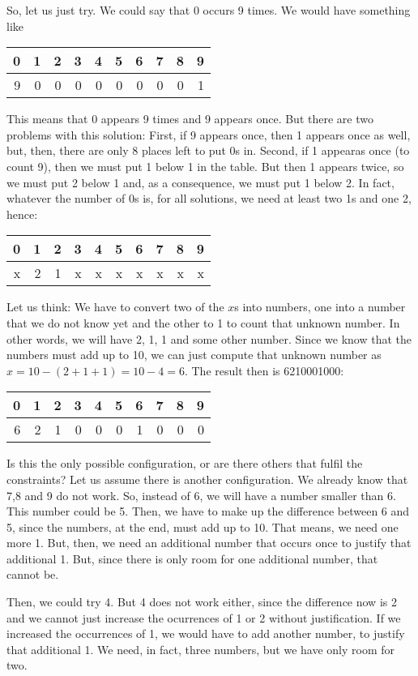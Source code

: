 \documentclass{scrreprt}
\begin{document}
So, let us just try.
We could say that 0 occurs 9 times.
We would have something like

\begin{tabular}{ r r r r r r r r r r}
0 & 1 & 2 & 3 & 4 & 5 & 6 & 7 & 8 & 9\\\hline
9 & 0 & 0 & 0 & 0 & 0 & 0 & 0 & 0 & 1 
\end{tabular}

This means that 0 appears 9 times
and 9 appears once.
But there are two problems with this solution:
First, if 9 appears once, then 1 appears once as well,
but, then, there are only 8 places left
to put 0s in. 
Second, if 1 appearas once (to count 9),
then we must put 1 below 1 in the table.
But then 1 appears twice, so we must put 2 below 1
and, as a consequence, we must put 1 below 2.
In fact, whatever the number of 0s is,
for all solutions, we need at least two 1s and one 2,
hence:

\begin{tabular}{ r r r r r r r r r r}
0 & 1 & 2 & 3 & 4 & 5 & 6 & 7 & 8 & 9\\\hline
x & 2 & 1 & x & x & x & x & x & x & x 
\end{tabular}

Let us think:
We have to convert two of the $x$s into numbers,
one into a number that we do not know yet 
and the other to 1 to count that unknown number.
In other words, we will have 2, 1, 1 and some other number.
Since we know that the numbers must add up to 10,
we can just compute that unknown number as
$x = 10 - (2 + 1 + 1) = 10 - 4 = 6$.
The result then is \num{6210001000}:

\begin{tabular}{ r r r r r r r r r r}
0 & 1 & 2 & 3 & 4 & 5 & 6 & 7 & 8 & 9\\\hline
6 & 2 & 1 & 0 & 0 & 0 & 1 & 0 & 0 & 0 
\end{tabular}

Is this the only possible configuration,
or are there others that fulfil the constraints?
Let us assume there is another configuration.
We already know that 7,8 and 9 do not work.
So, instead of 6, we will have a number smaller than 6.
This number could be 5.
Then, we have to make up the difference between 6 and 5,
since the numbers, at the end, must add up to 10.
That means, we need one more 1.
But, then, we need an additional number that occurs once
to justify that additional 1.
But, since there is only room for one additional number, 
that cannot be.

Then, we could try 4.
But 4 does not work either, since the difference now
is 2 and we cannot just increase the ocurrences of 1 or 2
without justification.
If we increased the occurrences of 1, 
we would have to add another number,
to justify that additional 1. 
We need, in fact, three numbers,
but we have only room for two.
\end{document}
